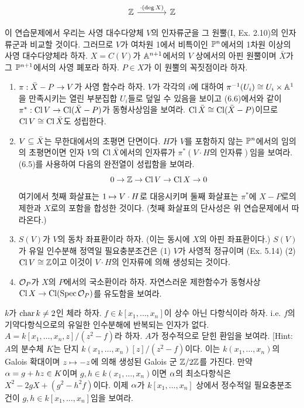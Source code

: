 \begin{enumerate}[label=\tb{6.\arabic*.},itemindent=0mm,itemsep=4mm]
{\begin{enumerate}[label=(\alph*)]
$$\begin{tikzcd}[column sep=large,row sep=large]
	\Z\arrow[r,"\cdot(\deg X)"]&\Z\end{tikzcd}$$
	\end{enumerate}
	\item {} 이 연습문제에서 우리는 사영 대수다양체 $V$의 인자류군을 그 원뿔(I, Ex. 2.10)의 인자류군과 비교할 것이다.
	그러므로 $V$가 여차원 1에서 비특이인 $\mathbb{P}^n$에서의 1차원 이상의 사영 대수다양체라 하자.
	$X=C(V)$가 $\mathbb{A}^{n+1}$에서의 $V$ 상에서의 아핀 원뿔이며 $\bar X$가 그 $\mathbb{P}^{n+1}$에서의 사영 폐포라 하자.
	$P\in X$가 이 원뿔의 꼭짓점이라 하자.
	\begin{enumerate}[label=(\alph*)]
	\item $\pi:\bar X-P\rightarrow V$가 사영 함수라 하자. $V$가 각각의 $i$에 대하여
	$\pi^{-1}(U_i)\cong U_i\times\mathbb{A}^1$을 만족시키는 열린 부분집합 $U_i$들로 덮일 수 있음을 보이고
	(6.6)에서와 같이 $\pi^*:\operatorname{Cl} V\rightarrow\operatorname{Cl}(\bar X-P)$가 동형사상임을 보여라.
	$\operatorname{Cl}\bar X\cong\operatorname{Cl}(\bar X-P)$이므로 $\operatorname{Cl} V\cong\operatorname{Cl}\bar X$도 성립한다.
	\item $V\subseteq\bar X$는 무한대에서의 초평면 단면이다.
	$H$가 $V$를 포함하지 않는 $\mathbb{P}^n$에서의 임의의 초평면이면
	인자 $V$의 $\operatorname{Cl}\bar X$에서의 인자류가 $\pi^*(V\cdot H\text{의 인자류})$임을 보여라.
	(6.5)를 사용하여 다음의 완전열이 성립함을 보여라.
	$$0\rightarrow\mathbb Z\rightarrow\operatorname{Cl} V\rightarrow\operatorname{Cl} X\rightarrow 0$$
	여기에서 첫째 화살표는 $1\mapsto V\cdot H$로 대응시키며 둘째 화살표는 $\pi^*$에 $X-P$로의 제한과 $X$로의 포함을 합성한 것이다.
	(첫째 화살표의 단사성은 위 연습문제에서 따라온다.)
	\item $S(V)$가 $V$의 동차 좌표환이라 하자. (이는 동시에 $X$의 아핀 좌표환이다.)
	$S(V)$가 유일 인수분해 정역일 필요충분조건은 (1) $V$가 사영적 정규이며 (Ex. 5.14)
	(2) $\operatorname{Cl} V\cong\mathbb Z$이고 이것이 $V\cdot H$의 인자류에 의해 생성되는 것이다.
	\item $\mathcal{O}_P$가 $X$의 $P$에서의 국소환이라 하자. 자연스러운 제한함수가 동형사상 $\operatorname{Cl} X\rightarrow\operatorname{Cl}(\operatorname{Spec}\mathcal{O}_P)$를 유도함을 보여라.
	\end{enumerate}}
	\item $k$가 $\operatorname{char} k\ne 2$인 체라 하자. $f\in k[x_1,\ldots,x_n]$이  상수 아닌 다항식이라 하자.
	i.e. $f$의 기약다항식으로의 유일한 인수분해에 반복되는 인자가 없다.
	$A=k[x_1,\ldots,x_n,z]/(z^2-f)$라 하자. $A$가 정수적으로 닫힌 환임을 보여라.
	[Hint: $A$의 분수체 $K$는 단지 $k(x_1,\ldots,x_n)[z]/(z^2-f)$이다.
	이는 $k(x_1,\ldots,x_n)$의 Galois 확대이며 $z\mapsto -z$에 의해 생성된 Galois 군 $\mathbb Z/2\mathbb Z$를 가진다.
	만약 $\alpha=g+hz\in K$이며 $g,h\in k(x_1,\ldots,x_n)$이면 $\alpha$의 최소다항식은 $X^2-2gX+(g^2-h^2f)$이다.
	이제 $\alpha$가 $k[x_1,\ldots,x_n]$ 상에서 정수적일 필요충분조건이 $g,h\in k[x_1,\ldots,x_n]$임을 보여라.

\end{enumerate}
